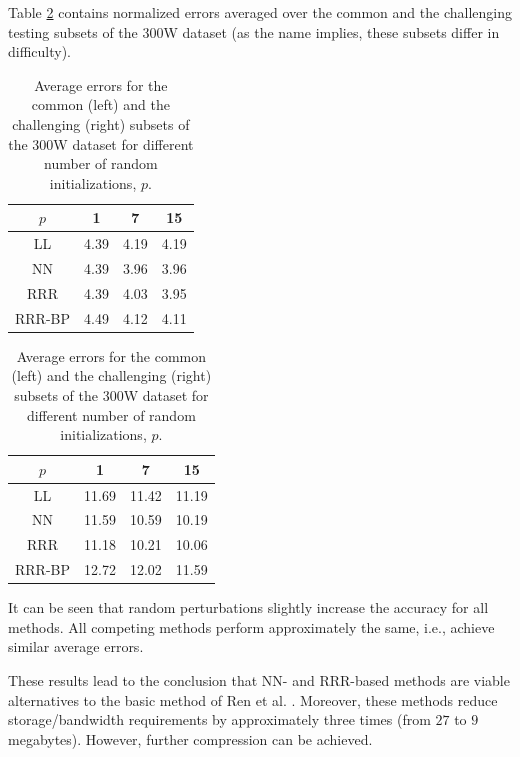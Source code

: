\documentclass{article}
\begin{document}
		Table \ref{tbl:avgerr} contains normalized errors averaged over the common and the challenging testing subsets of the 300W dataset
		(as the name implies, these subsets differ in difficulty).
		\begin{table}
			\centering
			\resizebox{!}{2.75em}
			{
				\begin{tabular}{| c || c | c | c |}
					\hline
					$p$	&	1	&	7	&	15	\\
					\hline
					\hline
					LL	&	4.39	&	4.19	&	4.19	\\
					\hline
					NN	&	4.39	&	3.96	&	3.96	\\
					\hline
					RRR	&	4.39	&	4.03	&	3.95	\\
					\hline
					RRR-BP	&	4.49	&	4.12	&	4.11	\\
					\hline
				\end{tabular}
			}
			\resizebox{!}{2.75em}
			{
				\begin{tabular}{| c || c | c | c |}
					\hline
					$p$	&	1	&	7	&	15	\\
					\hline
					\hline
					LL	&	11.69	&	11.42	&	11.19	\\
					\hline
					NN	&	11.59	&	10.59	&	10.19	\\
					\hline
					RRR	&	11.18	&	10.21	&	10.06	\\
					\hline
					RRR-BP	&	12.72	&	12.02	&	11.59	\\
					\hline
				\end{tabular}
			}
			\caption
			{
				Average errors for the common (left) and the challenging (right) subsets of the 300W dataset for different number of random initializations, $p$.
			}
		\label{tbl:avgerr}
		\end{table}
		It can be seen that random perturbations slightly increase the accuracy for all methods.
		All competing methods perform approximately the same, i.e., achieve similar average errors.

		These results lead to the conclusion that NN- and RRR-based methods are viable alternatives to the basic method of Ren et al. \cite{lbf}.
		Moreover, these methods reduce storage/bandwidth requirements by approximately three times
		(from $27$ to $9$ megabytes).
		However, further compression can be achieved.
\end{document}
